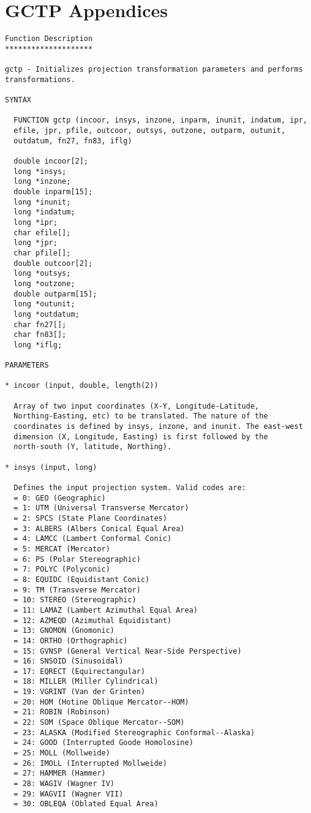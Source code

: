 \section{GCTP Appendices}
\label{gctp}
\begin{verbatim}
Function Description
********************

gctp - Initializes projection transformation parameters and performs
transformations.

SYNTAX

  FUNCTION gctp (incoor, insys, inzone, inparm, inunit, indatum, ipr,
  efile, jpr, pfile, outcoor, outsys, outzone, outparm, outunit,
  outdatum, fn27, fn83, iflg)

  double incoor[2];
  long *insys;
  long *inzone;
  double inparm[15];
  long *inunit;
  long *indatum;
  long *ipr;
  char efile[];
  long *jpr;
  char pfile[];
  double outcoor[2];
  long *outsys;
  long *outzone;
  double outparm[15];
  long *outunit;
  long *outdatum;
  char fn27[];
  char fn83[];
  long *iflg;

PARAMETERS

* incoor (input, double, length(2))

  Array of two input coordinates (X-Y, Longitude-Latitude,
  Northing-Easting, etc) to be translated. The nature of the
  coordinates is defined by insys, inzone, and inunit. The east-west
  dimension (X, Longitude, Easting) is first followed by the
  north-south (Y, latitude, Northing).

* insys (input, long)

  Defines the input projection system. Valid codes are:
  = 0: GEO (Geographic)
  = 1: UTM (Universal Transverse Mercator)
  = 2: SPCS (State Plane Coordinates)
  = 3: ALBERS (Albers Conical Equal Area)
  = 4: LAMCC (Lambert Conformal Conic)
  = 5: MERCAT (Mercator)
  = 6: PS (Polar Stereographic)
  = 7: POLYC (Polyconic)
  = 8: EQUIDC (Equidistant Conic)
  = 9: TM (Transverse Mercator)
  = 10: STEREO (Stereographic)
  = 11: LAMAZ (Lambert Azimuthal Equal Area)
  = 12: AZMEQD (Azimuthal Equidistant)
  = 13: GNOMON (Gnomonic)
  = 14: ORTHO (Orthographic)
  = 15: GVNSP (General Vertical Near-Side Perspective)
  = 16: SNSOID (Sinusoidal)
  = 17: EQRECT (Equirectangular)
  = 18: MILLER (Miller Cylindrical)
  = 19: VGRINT (Van der Grinten)
  = 20: HOM (Hotine Oblique Mercator--HOM)
  = 21: ROBIN (Robinson)
  = 22: SOM (Space Oblique Mercator--SOM)
  = 23: ALASKA (Modified Stereographic Conformal--Alaska)
  = 24: GOOD (Interrupted Goode Homolosine)
  = 25: MOLL (Mollweide)
  = 26: IMOLL (Interrupted Mollweide)
  = 27: HAMMER (Hammer)
  = 28: WAGIV (Wagner IV)
  = 29: WAGVII (Wagner VII)
  = 30: OBLEQA (Oblated Equal Area)


\end{verbatim}

